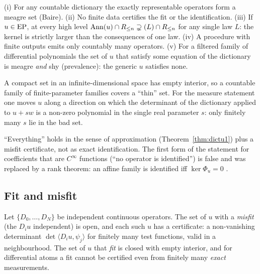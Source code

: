 \begin{theorem}\label{thm:dictn1}
(i) For any countable dictionary the exactly representable operators form a meagre set (Baire). (ii) No finite data certifies the fit or the identification. (iii) If $u\in\mathrm{EP}$, at every high level $\operatorname{Ann}(u)\cap R_{\le n}\supsetneq(L)\cap R_{\le n}$ for any single law $L$: the kernel is strictly larger than the consequences of one law. (iv) A procedure with finite outputs emits only countably many operators. (v) For a filtered family of differential polynomials the set of $u$ that satisfy some equation of the dictionary is meagre \emph{and} shy (prevalence): the generic $u$ satisfies none.
\end{theorem}

\begin{intuition}
A compact set in an infinite-dimensional space has empty interior, so a countable family of finite-parameter families covers a ``thin'' set. For the measure statement one moves $u$ along a direction on which the determinant of the dictionary applied to $u+sw$ is a non-zero polynomial in the single real parameter $s$: only finitely many $s$ lie in the bad set.
\end{intuition}

\begin{caution}[title=What this theorem does not say]
``Everything'' holds in the sense of approximation (Theorem~\ref{thm:dictu1}) plus a misfit certificate, not as exact identification. The first form of the statement for coefficients that are $C^\infty$ functions (``no operator is identified'') is false and was replaced by a rank theorem: an affine family is identified iff $\ker\Phi_u=0$ .
\end{caution}

\subsection{Fit and misfit}

\begin{theorem}\label{thm:dicta}
Let $\{D_0,\dots,D_N\}$ be independent continuous operators. The set of $u$ with a \emph{misfit} (the $D_iu$ independent) is open, and each such $u$ has a certificate: a non-vanishing determinant $\det\langle D_iu,\psi_j\rangle$ for finitely many test functions, valid in a neighbourhood. The set of $u$ that \emph{fit} is closed with empty interior, and for differential atoms a fit cannot be certified even from finitely many \emph{exact} measurements.
\end{theorem}

